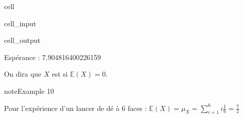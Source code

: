 \documentclass[letterpaper,10pt,english]{jupyterBook}
\begin{document}
\begin{sphinxuseclass}{cell}\begin{sphinxVerbatimInput}

\begin{sphinxuseclass}{cell_input}
\begin{sphinxVerbatim}[commandchars=\\\{\}]
   
   
   
   
 
      
           
  
     
\end{sphinxVerbatim}

\end{sphinxuseclass}\end{sphinxVerbatimInput}
\begin{sphinxVerbatimOutput}

\begin{sphinxuseclass}{cell_output}
\begin{sphinxVerbatim}[commandchars=\\\{\}]
Espérance :  7.904816400226159
\end{sphinxVerbatim}

\end{sphinxuseclass}\end{sphinxVerbatimOutput}

\end{sphinxuseclass}
\sphinxAtStartPar
On dira que \(X\) est  si \(\mathbb{E}(X)=0\).
\label{Rappels:example-26}
\begin{sphinxadmonition}{note}{Example 10}



\sphinxAtStartPar
Pour l’expérience d’un lancer de dé à 6 faces  : \(\mathbb E(X) = \mu_X = \displaystyle\sum_{i=1}^6 i\frac16 = \frac72\)
\end{sphinxadmonition}
\end{document}
